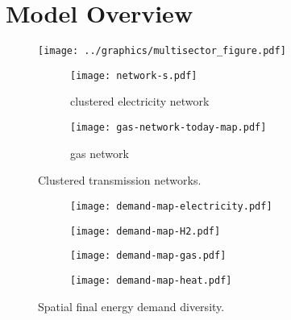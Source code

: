 \section{Model Overview}

\begin{figure}
    \centering
    \texttt{[image: ../graphics/multisector\_figure.pdf]}
\end{figure}

\begin{figure}
    \centering
    \begin{subfigure}[t]{0.49\textwidth}
        \centering
        \caption{clustered electricity network}
        \texttt{[image: network-s.pdf]}
    \end{subfigure}
    \begin{subfigure}[t]{0.49\textwidth}
        \centering
        \caption{gas network}
        \texttt{[image: gas-network-today-map.pdf]}
    \end{subfigure}
    \caption{Clustered transmission networks.}
    \label{fig:clustered-networks}
\end{figure}

\begin{figure}
    \centering
    \begin{subfigure}[t]{0.49\textwidth}
        \centering
        \texttt{[image: demand-map-electricity.pdf]}
    \end{subfigure}
    \begin{subfigure}[t]{0.49\textwidth}
        \centering
        \texttt{[image: demand-map-H2.pdf]}
    \end{subfigure}
    \begin{subfigure}[t]{0.49\textwidth}
        \centering
        \texttt{[image: demand-map-gas.pdf]}
    \end{subfigure}
    \begin{subfigure}[t]{0.49\textwidth}
        \centering
        \texttt{[image: demand-map-heat.pdf]}
    \end{subfigure}
    \caption{Spatial final energy demand diversity.}
    \label{fig:demand}
\end{figure}


